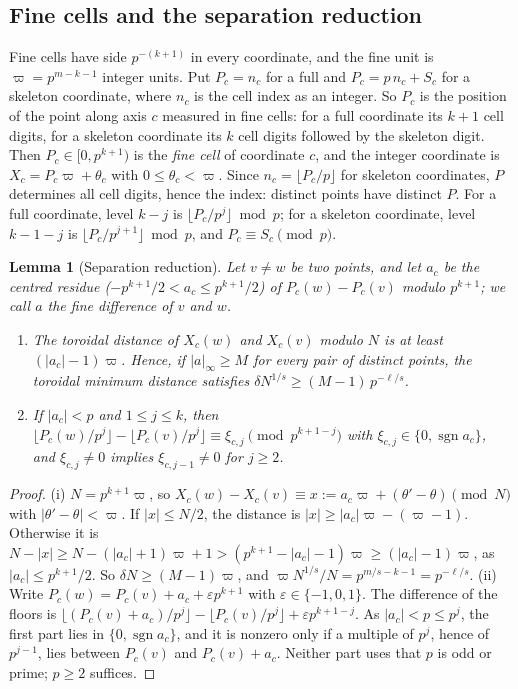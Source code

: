 \documentclass[11pt]{amsart}
\newtheorem{lemma}[theorem]{Lemma}
\theoremstyle{definition}
\theoremstyle{plain}
\DeclareMathOperator{\sgn}{sgn}
\begin{document}
\subsection{Fine cells and the separation reduction}\label{sec:fine}
Fine cells have side $p^{-(k+1)}$ in every coordinate, and the fine unit is $\varpi=p^{m-k-1}$ integer units. Put $P_c=n_c$ for a full and $P_c=p\,n_c+S_c$ for a skeleton coordinate, where $n_c$ is the cell index as an integer. So $P_c$ is the position of the point along axis $c$ measured in fine cells: for a full coordinate its $k+1$ cell digits, for a skeleton coordinate its $k$ cell digits followed by the skeleton digit. Then $P_c\in[0,p^{k+1})$ is the \emph{fine cell} of coordinate $c$, and the integer coordinate is $X_c=P_c\varpi+\theta_c$ with $0\le\theta_c<\varpi$. Since $n_c=\lfloor P_c/p\rfloor$ for skeleton coordinates, $P$ determines all cell digits, hence the index: distinct points have distinct $P$. For a full coordinate, level $k-j$ is $\lfloor P_c/p^j\rfloor\bmod p$; for a skeleton coordinate, level $k-1-j$ is $\lfloor P_c/p^{j+1}\rfloor\bmod p$, and $P_c\equiv S_c\pmod p$.

\begin{lemma}[Separation reduction]\label{lem:skelred}\label{lem:fine}
Let $v\ne w$ be two points, and let $a_c$ be the centred residue ($-p^{k+1}/2<a_c\le p^{k+1}/2$) of $P_c(w)-P_c(v)$ modulo $p^{k+1}$; we call $a$ the \emph{fine difference} of $v$ and $w$.
\begin{enumerate}
\item[(i)] The toroidal distance of $X_c(w)$ and $X_c(v)$ modulo $N$ is at least $(|a_c|-1)\varpi$. Hence, if $|a|_\infty\ge M$ for every pair of distinct points, the toroidal minimum distance satisfies $\delta N^{1/s}\ge(M-1)\,p^{-\ell/s}$.
\item[(ii)] If $|a_c|<p$ and $1\le j\le k$, then $\lfloor P_c(w)/p^j\rfloor-\lfloor P_c(v)/p^j\rfloor\equiv\xi_{c,j}\pmod{p^{k+1-j}}$ with $\xi_{c,j}\in\{0,\sgn a_c\}$, and $\xi_{c,j}\ne0$ implies $\xi_{c,j-1}\ne0$ for $j\ge2$.
\end{enumerate}
\end{lemma}

\begin{proof}
(i) $N=p^{k+1}\varpi$, so $X_c(w)-X_c(v)\equiv x:=a_c\varpi+(\theta'-\theta)\pmod N$ with $|\theta'-\theta|<\varpi$. If $|x|\le N/2$, the distance is $|x|\ge|a_c|\varpi-(\varpi-1)$. Otherwise it is $N-|x|\ge N-(|a_c|+1)\varpi+1>(p^{k+1}-|a_c|-1)\varpi\ge(|a_c|-1)\varpi$, as $|a_c|\le p^{k+1}/2$. So $\delta N\ge(M-1)\varpi$, and $\varpi N^{1/s}/N=p^{m/s-k-1}=p^{-\ell/s}$. (ii) Write $P_c(w)=P_c(v)+a_c+\varepsilon p^{k+1}$ with $\varepsilon\in\{-1,0,1\}$. The difference of the floors is $\lfloor(P_c(v)+a_c)/p^j\rfloor-\lfloor P_c(v)/p^j\rfloor+\varepsilon p^{k+1-j}$. As $|a_c|<p\le p^j$, the first part lies in $\{0,\sgn a_c\}$, and it is nonzero only if a multiple of $p^j$, hence of $p^{j-1}$, lies between $P_c(v)$ and $P_c(v)+a_c$. Neither part uses that $p$ is odd or prime; $p\ge2$ suffices.
\end{proof}
\end{document}
